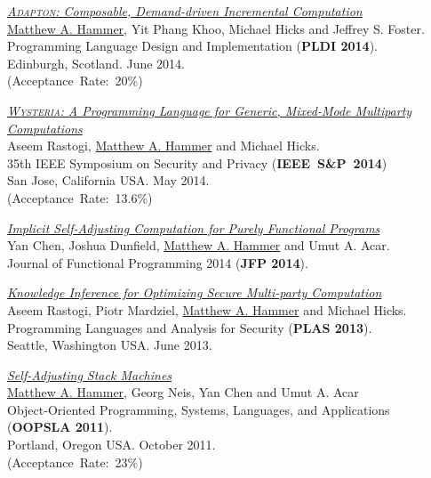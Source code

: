 \documentclass[10pt,letterpaper]{article}
\newcommand{\BeanCounter}[1]{(Acceptance~Rate:~#1\%)}
\renewenvironment{itemize}{
  \begin{list}{}{
    \setlength{\leftmargin}{1.5em}
    \setlength{\itemsep}{0.25em}
    \setlength{\parskip}{0pt}
    \setlength{\parsep}{0.25em}
  }
}{
  \end{list}
}
\begin{document}
\begin{itemize}
\item
\href{http://www.cs.umd.edu/~hammer/adapton}
{\textit{\textsc{Adapton}: Composable, Demand-driven Incremental Computation}}
\\
\underline{Matthew A. Hammer}, Yit Phang Khoo, Michael Hicks and Jeffrey S. Foster.
\\
Programming Language Design and Implementation (\textbf{PLDI 2014}).
\\
Edinburgh, Scotland. June 2014.
\\
\BeanCounter{20}

\item
\href{http://www.cs.umd.edu/~hammer/oakland2014}
{\textit{\textsc{Wysteria}: A Programming Language for Generic, Mixed-Mode Multiparty Computations}}
\\
Aseem Rastogi, \underline{Matthew A. Hammer} and Michael Hicks.
\\
35th IEEE Symposium on Security and Privacy (\textbf{IEEE~S\&P~2014})
\\
San Jose, California USA. May 2014.
\\
\BeanCounter{13.6}

\item
\href{http://www.cs.umd.edu/~hammer/jfp2014}
{\textit{Implicit Self-Adjusting Computation for Purely Functional Programs}}
\\
Yan Chen, Joshua Dunfield, \underline{Matthew A. Hammer} and Umut A. Acar.
\\
Journal of Functional Programming 2014 (\textbf{JFP 2014}).

\item
\href{http://www.cs.umd.edu/~hammer/plas2013}
{\textit{Knowledge Inference for Optimizing Secure Multi-party Computation}}
\\
Aseem Rastogi, Piotr Mardziel, \underline{Matthew A. Hammer} and Michael Hicks.
\\
Programming Languages and Analysis for Security (\textbf{PLAS 2013}).
\\
Seattle, Washington USA. June 2013.

\item
\href{http://www.cs.umd.edu/~hammer/oopsla11}
{\textit{Self-Adjusting Stack Machines}}
\\
\underline{Matthew A. Hammer}, Georg Neis, Yan Chen and Umut A. Acar 
\\
Object-Oriented Programming, Systems, Languages, and Applications
(\textbf{OOPSLA 2011}).
\\
Portland, Oregon USA. October 2011.
\\
\BeanCounter{23}


\end{itemize}
\end{document}
